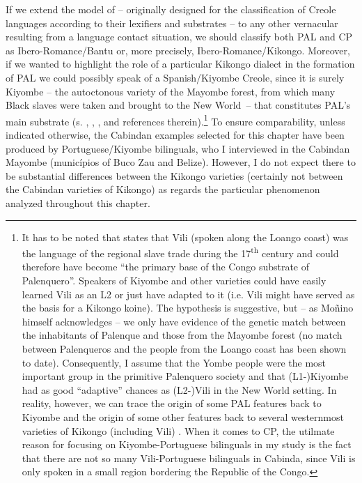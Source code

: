 \documentclass[output=paper,colorlinks,citecolor=brown]{langscibook}
\begin{document}
If we extend the model of \citet{Michaelis2017} -- originally designed for the classification of Creole languages according to their lexifiers and substrates -- to any other vernacular resulting from a language contact situation, we should classify both PAL and CP as Ibero\hyp Romance\slash Bantu or, more precisely, Ibero\hyp Romance\slash Kikongo. Moreover, if we wanted to highlight the role of a particular Kikongo dialect in the formation of PAL we could possibly speak of a Spanish\slash Kiyombe Creole, since it is surely Kiyombe -- the autoctonous variety of the Mayombe forest, from which many Black slaves were taken and brought to the New World~-- that constitutes PAL’s main substrate (s. \cite{Moñino2017}, \cite{Schwegler2016a}, \citeyear{Schwegler2017}, \cite{GutiérrezMaté2020} and references therein).\footnote{It has to be noted that \citet[24--25]{Moñino2017} states that Vili (spoken along the Loango coast) was the language of the regional slave trade during the 17\textsuperscript{th} century and could therefore have become “the primary base of the Congo substrate of Palenquero”. Speakers of Kiyombe and other varieties could have easily learned Vili as an L2 or just have adapted to it (i.e. Vili might have served as the basis for a Kikongo koine). The hypothesis is suggestive, but -- as Moñino himself acknowledges -- we only have evidence of the genetic match between the inhabitants of Palenque and those from the Mayombe forest (no match between Palenqueros and the people from the Loango coast has been shown to date). Consequently, I assume that the Yombe people were the most important group in the primitive Palenquero society and that (L1-)Kiyombe had as good “adaptive” chances as (L2-)Vili in the New World setting. In reality, however, we can trace the origin of some PAL features back to Kiyombe and the origin of some other features back to several westernmost varieties of Kikongo (including Vili) \citep{GutMat}. When it comes to CP, the utilmate reason for focusing on Kiyombe-Portuguese bilinguals in my study is the fact that there are not so many Vili-Portuguese bilinguals in Cabinda, since Vili is only spoken in a small region bordering the Republic of the Congo.} To ensure comparability, unless indicated otherwise, the Cabindan examples selected for this chapter have been produced by Portuguese/Kiyombe bilinguals, who I interviewed in the Cabindan Mayombe (municípios of Buco Zau and Belize). However, I do not expect there to be substantial differences between the Kikongo varieties (certainly not between the Cabindan varieties of Kikongo) as regards the particular phenomenon analyzed throughout this chapter.
\end{document}

